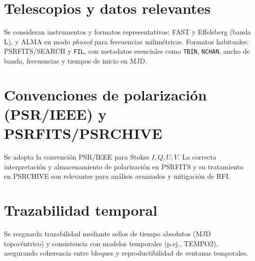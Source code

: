 \section{Telescopios y datos relevantes}
Se consideran instrumentos y formatos representativos: FAST y Effelsberg (banda L), y ALMA en modo \textit{phased} para frecuencias milimétricas. Formatos habituales: PSRFITS/SEARCH y \texttt{FIL}, con metadatos esenciales como \texttt{TBIN}, \texttt{NCHAN}, ancho de banda, frecuencias y tiempos de inicio en MJD.

\section{Convenciones de polarización (PSR/IEEE) y PSRFITS/PSRCHIVE}
Se adopta la convención PSR/IEEE para Stokes \(I,Q,U,V\). La correcta interpretación y almacenamiento de polarización en PSRFITS y su tratamiento en PSRCHIVE son relevantes para análisis avanzados y mitigación de RFI.

\section{Trazabilidad temporal}
Se resguarda trazabilidad mediante sellos de tiempo absolutos (MJD topocéntrico) y consistencia con modelos temporales (p.ej., TEMPO2), asegurando coherencia entre bloques y reproductibilidad de ventanas temporales.
